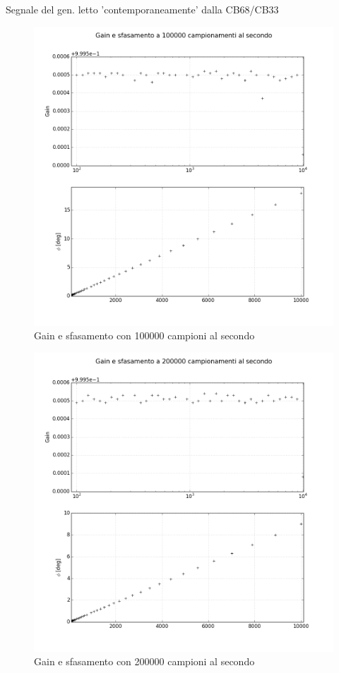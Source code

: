 \documentclass{beamer}
\begin{document}
\begin{frame}{Segnale del gen. letto 'contemporaneamente' dalla CB68/CB33}
\begin{figure}
\centering
\includegraphics[width=0.6\linewidth]{./subplots_errors_amplitude100000}
\caption{Gain e sfasamento con 100000 campioni al secondo}
\label{fig:sfasamento100000}
\end{figure}
\end{frame}

\begin{frame}
\begin{figure}
\centering
\includegraphics[width=0.6\linewidth]{./subplots_errors_amplitude200000}
\caption{Gain e sfasamento con 200000 campioni al secondo}
\label{fig:sfasamento200000}
\end{figure}
\end{frame}
\end{document}

